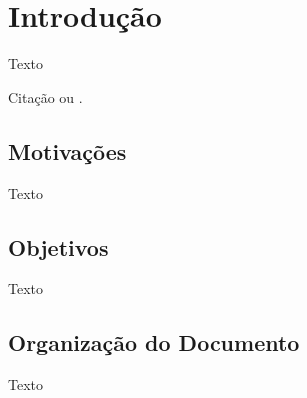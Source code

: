 \chapter{Introdução}

Texto

Citação \cite{Nascimento2014} ou .

\section{Motivações}

Texto

\section{Objetivos}

Texto

\section{Organização do Documento}

Texto
